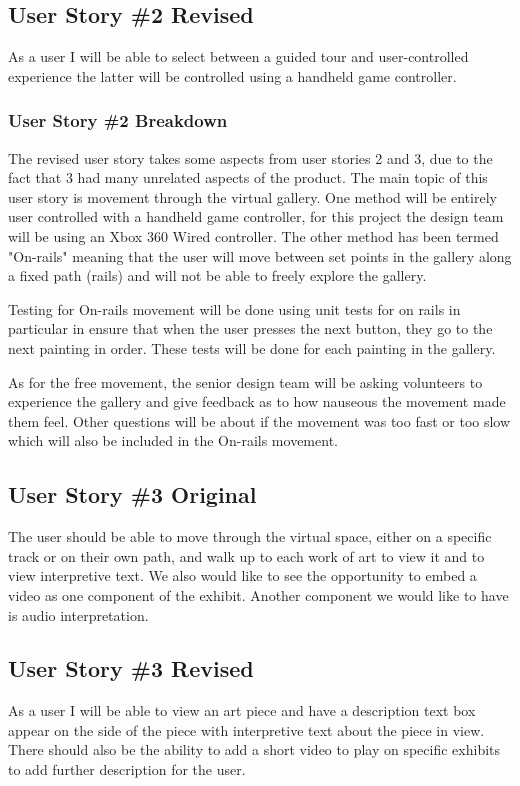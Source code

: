 \subsection{User Story \#2 Revised}
As a user I will be able to select between a guided tour and user-controlled experience the latter will be controlled using a handheld game controller.

\subsubsection{User Story \#2 Breakdown}
The revised user story takes some aspects from user stories 2 and 3, due to the fact that 3 had many unrelated aspects of the product.  The main topic of this user story is movement through the virtual gallery.  One method will be entirely user controlled with a handheld game controller, for this project the design team will be using an Xbox 360 Wired controller.  The other method has been termed "On-rails" meaning that the user will move between set points in the gallery along a fixed path (rails) and will not be able to freely explore the gallery.

Testing for On-rails movement will be done using unit tests for on rails in particular in ensure that when the user presses the next button, they go to the next painting in order.  These tests will be done for each painting in the gallery.

As for the free movement, the senior design team will be asking volunteers to experience the gallery and give feedback as to how nauseous the movement made them feel.  Other questions will be about if the movement was too fast or too slow which will also be included in the On-rails movement.  

\hrulefill

\subsection{User Story \#3 Original} 
The user should be able to move through the virtual space, either on a specific track or on their own path, and walk up to each work of art to view it and to view interpretive text. We also would like to see the opportunity to embed a video as one component of the exhibit. Another component we would like to have is audio interpretation. 

\subsection{User Story \#3 Revised}
As a user I will be able to view an art piece and have a description text box appear on the side of the piece with interpretive text about the piece in view.  There should also be the ability to add a short video to play on specific exhibits to add further description for the user.

